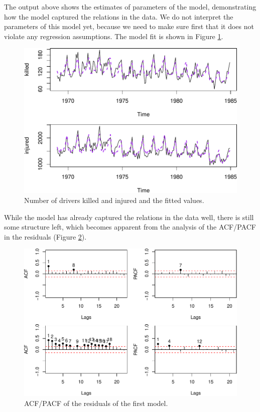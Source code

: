 \documentclass[
]{book}
\begin{document}
The output above shows the estimates of parameters of the model, demonstrating how the model captured the relations in the data. We do not interpret the parameters of this model yet, because we need to make sure first that it does not violate any regression assumptions.
The model fit is shown in Figure \ref{fig:seatbeltsDataModel1}.

\begin{figure}
\centering
\includegraphics{Svetunkov---Svetunkov---Complex-Valued-Econometrics_files/figure-latex/seatbeltsDataModel1-1.pdf}
\caption{\label{fig:seatbeltsDataModel1}Number of drivers killed and injured and the fitted values.}
\end{figure}

While the model has already captured the relations in the data well, there is still some structure left, which becomes apparent from the analysis of the ACF/PACF in the residuals (Figure \ref{fig:seatbeltsDataModel1ACF}).

\begin{figure}
\centering
\includegraphics{Svetunkov---Svetunkov---Complex-Valued-Econometrics_files/figure-latex/seatbeltsDataModel1ACF-1.pdf}
\caption{\label{fig:seatbeltsDataModel1ACF}ACF/PACF of the residuals of the first model.}
\end{figure}
\end{document}
